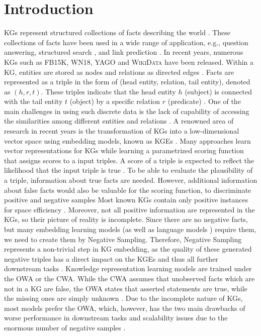 \chapter{Introduction}
\label{ch:introduction}

\acp{KG} represent structured collections of facts describing the world \cite{hogan2020knowledge}.
These collections of facts have been used in a wide range of application, e.g., question answering, structured search \cite{zhang2019nscaching}, and link prediction \cite{cai2017kbgan, Alam2020AffinityDN}.
In recent years, numerous \acp{KG} such as \textsc{FB15K}, \textsc{WN18}, \textsc{YAGO} \cite{ConEx} and \textsc{WikiData} \cite{arnaoutwikinegata} have been released.
Within a \ac{KG}, entities are stored as nodes and relations as directed edges \cite{zhang2019nscaching}.
Facts are represented as a triple in the form of (head entity, relation, tail entity), denoted as $(h, r, t)$.
These triples indicate that the head entity $h$ (subject) is connected with the tail entity $t$ (object) by a specific relation $r$ (predicate) \cite{zhang2019nscaching, Alam2020AffinityDN}.
One of the main challenges in using such discrete data is the lack of capability of accessing the similarities among different entities and relations \cite{cai2017kbgan}. 
A renowned area of research in recent years is the transformation of \acp{KG} into a low-dimensional vector space using embedding models, known as \acp{KGE} \cite{Alam2020AffinityDN}.
Many approaches learn vector representations for \acp{KG} while learning a parametrized scoring function that assigns scores to a input triples.
A score of a triple is expected to reflect the likelihood that the input triple is true \cite{ConvE, qiannegative}.
To be able to evaluate the plausibility of a triple, information about true facts are needed.
However, additional information about false facts would also be valuable for the scoring function, to discriminate positive and negative samples \cite{qiannegative}
Most known \acp{KG} contain only positive instances
for space efficiency \cite{qiannegative}.
Moreover, not all positive information are represented in the \acp{KG}, so their picture of reality is incomplete.
Since there are no negative facts, but many embedding learning models (as well as language models \cite{MikolovSCCD13}) require them, we need to create them by Negative Sampling.
Therefore, Negative Sampling represents a non-trivial step in \ac{KG} embedding, as the quality of these generated negative triples has a direct impact on the \acp{KGE} and thus all further downstream tasks \cite{qiannegative}.
Knowledge representation learning models are trained under the \ac{OWA} or the \ac{CWA}.
While the \ac{CWA} assumes that unobserved facts which are not in a \ac{KG} are false, the \ac{OWA}  states that asserted statements are true, while the missing ones are simply unknown \cite{arnaout2020enriching, qiannegative}.
Due to the incomplete nature of KGs, most models prefer the \ac{OWA}, which, however, has the two main drawbacks of 
worse performance in downstream tasks and scalability issues due to the enormous number of negative samples \cite{qiannegative}.

